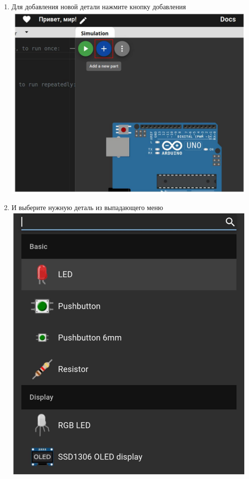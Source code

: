 \begin{enumerate}
    \item Для добавления новой детали нажмите кнопку добавления\\
    \includegraphics[max width=\maxwidth, max height=\maxheight, center]{10}

    \clearpage\item И выберите нужную деталь из выпадающего меню\\
    \includegraphics[max width=\maxwidth, max height=\maxheight, center]{11}

\end{enumerate}
